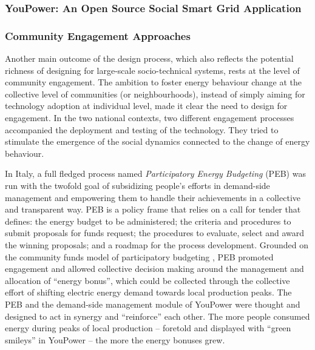 \cite{Huang2017}

\subsubsection{YouPower: An Open Source Social Smart Grid Application} %





\subsubsection{Community Engagement Approaches} %

Another main outcome of the design process, which also reflects the potential richness of designing for large-scale socio-technical systems, rests at the level of community engagement. %
The ambition to foster energy behaviour change at the collective level of communities (or neighbourhoods),
instead of simply aiming for technology adoption at individual level, made it clear the need to design for
engagement.
% 
In the two national contexts, two different engagement processes accompanied the deployment and testing of the technology. They tried to stimulate the emergence of the social dynamics connected to the change of energy behaviour. 

In Italy, a full fledged process named \textit{Participatory Energy Budgeting} (PEB) \cite{capaccioli_exploring_2017,capaccioli_exploring_2016}
was run with the twofold goal of subsidizing people's efforts in demand-side management
and empowering them to handle their achievements in a collective and transparent way.
%
PEB is a policy frame that relies on a call for tender that
defines: the energy budget to be administered;
the criteria and procedures to submit proposals for funds request; the procedures
to evaluate, select and award the winning proposals; and a roadmap for the process development. 
Grounded on the community funds model of participatory budgeting \cite{Ganuza2012,Sintomer2008},
PEB promoted engagement and allowed collective decision
making around the management and allocation of ``energy bonus'', which could be
collected through the collective effort of shifting electric energy demand
towards local production peaks.
% 
The PEB and the demand-side management module of YouPower
were thought and designed to act in synergy and ``reinforce'' each other.
The more people consumed energy during peaks of local production -- foretold and displayed
with ``green smileys'' in YouPower -- the more the energy bonuses grew.

